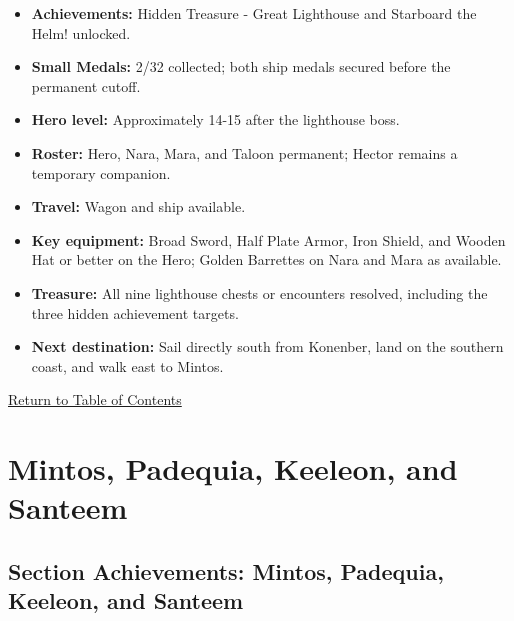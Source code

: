 \documentclass[
  american,
  10pt,
  letterpaper,
  oneside,
  open=any]{scrreprt}
\providecommand{\tightlist}{%
  \setlength{\itemsep}{0pt}\setlength{\parskip}{0pt}}
\begin{document}
\begin{itemize}
\tightlist
\item
  \textbf{Achievements:} Hidden Treasure - Great Lighthouse and
  Starboard the Helm! unlocked.
\item
  \textbf{Small Medals:} 2/32 collected; both ship medals secured before
  the permanent cutoff.
\item
  \textbf{Hero level:} Approximately 14-15 after the lighthouse boss.
\item
  \textbf{Roster:} Hero, Nara, Mara, and Taloon permanent; Hector
  remains a temporary companion.
\item
  \textbf{Travel:} Wagon and ship available.
\item
  \textbf{Key equipment:} Broad Sword, Half Plate Armor, Iron Shield,
  and Wooden Hat or better on the Hero; Golden Barrettes on Nara and
  Mara as available.
\item
  \textbf{Treasure:} All nine lighthouse chests or encounters resolved,
  including the three hidden achievement targets.
\item
  \textbf{Next destination:} Sail directly south from Konenber, land on
  the southern coast, and walk east to Mintos.
\end{itemize}

\hyperref[table-of-contents]{Return to Table of Contents}

\chapter{Mintos, Padequia, Keeleon, and
Santeem}\label{mintos-padequia-keeleon-and-santeem}

\section{Section Achievements: Mintos, Padequia, Keeleon, and
Santeem}\label{section-achievements-mintos-padequia-keeleon-and-santeem}
\end{document}
